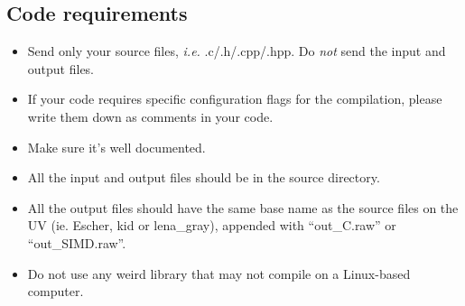 \documentclass[10pt,a4paper]{article}
\theoremstyle{definition}%
\begin{document}
\subsection*{Code requirements}

\begin{itemize}
	\item Send only your source files, \textit{i.e.} .c/.h/.cpp/.hpp. Do \textit{not} send the input and output files.
	\item If your code requires specific configuration flags for the compilation, please write them down as comments in your code.
	\item Make sure it's well documented.
	\item All the input and output files should be in the source directory.
	\item All the output files should have the same base name as the source files on the UV (ie. Escher, kid or lena\_gray), appended with ``out\_C.raw'' or ``out\_SIMD.raw''.
	\item Do not use any weird library that may not compile on a Linux-based computer.
\end{itemize}
\end{document}
